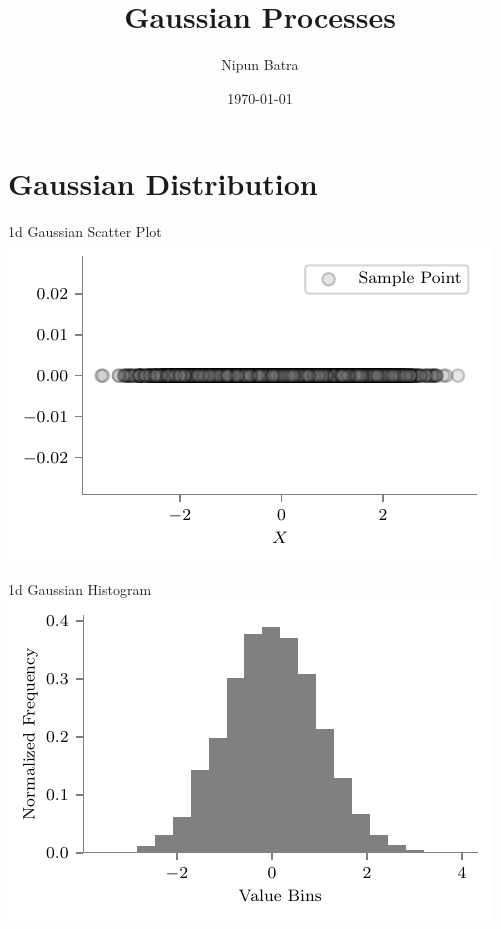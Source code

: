 \documentclass{beamer}
\title{Gaussian Processes}
\date{\today}
\author{Nipun Batra}
\institute{IIT Gandhinagar}
\begin{document}
  \maketitle
  
  
  
\section{Gaussian Distribution}
  \begin{frame}{1d Gaussian Scatter Plot}
    \includegraphics[width=\linewidth,height=\textheight,keepaspectratio]{gp/1d-gp}
  \end{frame}

  \begin{frame}{1d Gaussian Histogram}
\includegraphics[width=\linewidth,height=\textheight,keepaspectratio]{gp/1d-gp-hist}
\end{frame}
\end{document}
